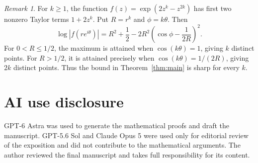 \documentclass[11pt]{article}
\theoremstyle{remark}
\newtheorem{remark}[theorem]{Remark}
\numberwithin{equation}{section}
\begin{document}
\begin{remark}\label{rem:sharp}
For \(k\ge1\), the function
\(f(z)=\exp(2z^k-z^{2k})\) has first two nonzero Taylor terms
\(1+2z^k\). Put \(R=r^k\) and \(\phi=k\theta\). Then
\[
 \log|f(re^{i\theta})|
 =R^2+\frac12
   -2R^2\left(\cos\phi-\frac1{2R}\right)^2.
\]
For \(0<R\le1/2\), the maximum is attained when
\(\cos(k\theta)=1\), giving \(k\) distinct points. For \(R>1/2\),
it is attained precisely when \(\cos(k\theta)=1/(2R)\), giving
\(2k\) distinct points. Thus the bound in Theorem~\ref{thm:main}
is sharp for every \(k\).
\end{remark}

\section*{AI use disclosure}

GPT-6 Astra was used to generate the mathematical proofs and draft the
manuscript. GPT-5.6 Sol and Claude Opus 5 were used only for editorial
review of the exposition and did not contribute to the mathematical
arguments. The author reviewed the final manuscript and takes full
responsibility for its content.
\end{document}
